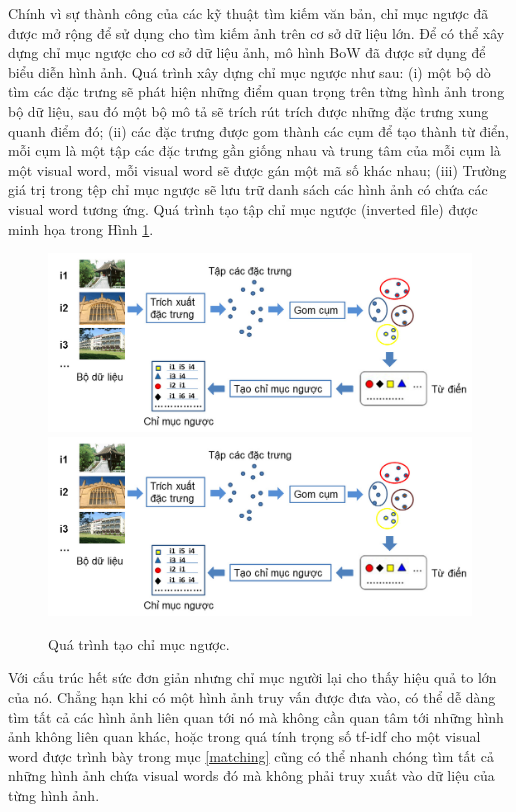 Chính vì sự thành công của các kỹ thuật tìm kiếm văn bản, chỉ mục ngược đã được mở rộng để sử dụng cho tìm kiếm ảnh trên cơ sở dữ liệu lớn. Để có thể xây dựng chỉ mục ngược cho cơ sở dữ liệu ảnh, mô hình BoW đã được sử dụng để biểu diễn hình ảnh. Quá trình xây dựng chỉ mục ngược như sau: (i) một bộ dò tìm các đặc trưng sẽ phát hiện những điểm quan trọng trên từng hình ảnh trong bộ dữ liệu, sau đó một bộ mô tả sẽ trích rút trích được những đặc trưng xung quanh điểm đó; (ii) các đặc trưng được gom thành các cụm để tạo thành từ điển, mỗi cụm là một tập các đặc trưng gần giống nhau và trung tâm của mỗi cụm là một visual word, mỗi visual word sẽ được gán một mã số khác nhau; (iii) Trường giá trị trong tệp chỉ mục ngược sẽ lưu trữ danh sách các hình ảnh có chứa các visual word tương ứng. Quá trình tạo tập chỉ mục ngược (inverted file) được minh họa trong Hình \ref{FigInvertedFile}.

\begin{figure}[!htbp]
  \begin{center}
    \leavevmode
    \ifpdf
      \includegraphics[scale=0.51]{invertedFile}
    \else
      \includegraphics[scale=0.51]{invertedFile}
    \fi
    \caption[Quá trình tạo chỉ mục ngược]{Quá trình tạo chỉ mục ngược.}
    \label{FigInvertedFile}
  \end{center}
\end{figure}

Với cấu trúc hết sức đơn giản nhưng chỉ mục người lại cho thấy hiệu quả to lớn của nó. Chẳng hạn khi có một hình ảnh truy vấn được đưa vào, có thể dễ dàng tìm tất cả các hình ảnh liên quan tới nó mà không cần quan tâm tới những hình ảnh không liên quan khác, hoặc trong quá tính trọng số tf-idf cho một visual word được trình bày trong mục \ref{matching} cũng có thể nhanh chóng tìm tất cả những hình ảnh chứa visual words đó mà không phải truy xuất vào dữ liệu của từng hình ảnh.

